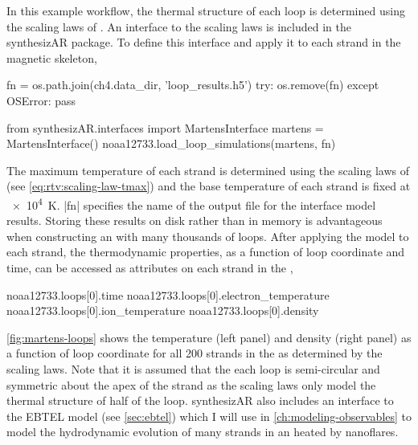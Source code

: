 In this example workflow, the thermal structure of each loop is determined using the scaling laws of \citet[see \autoref{sec:scaling_laws}]{martens_scaling_2010}. An interface to the \citeauthor{martens_scaling_2010} scaling laws is included in the synthesizAR package. To define this interface and apply it to each strand in the magnetic skeleton,
\begin{pycode}[chapter4]
fn = os.path.join(ch4.data_dir, 'loop_results.h5')
try:
    os.remove(fn)
except OSError:
    pass
\end{pycode}
\begin{pyblock}[chapter4][baselinestretch=1,xleftmargin=3em]
from synthesizAR.interfaces import MartensInterface
martens = MartensInterface()
noaa12733.load_loop_simulations(martens, fn)
\end{pyblock}
The maximum temperature of each strand is determined using the scaling laws of \citet{rosner_dynamics_1978} (see \autoref{eq:rtv:scaling-law-tmax}) and the base temperature of each strand is fixed at \SI{e4}{\kelvin}. \pyv|fn| specifies the name of the output file for the interface model results. Storing these results on disk rather than in memory is advantageous when constructing an \AR{} with many thousands of loops. After applying the model to each strand, the thermodynamic properties, as a function of loop coordinate and time, can be accessed as attributes on each strand in the \AR{},
\begin{pyblock}[chapter4][baselinestretch=1,xleftmargin=3em]
noaa12733.loops[0].time
noaa12733.loops[0].electron_temperature
noaa12733.loops[0].ion_temperature
noaa12733.loops[0].density
\end{pyblock}
\autoref{fig:martens-loops} shows the temperature (left panel) and density (right panel) as a function of loop coordinate for all 200 strands in the \AR{} as determined by the \citeauthor{martens_scaling_2010} scaling laws. Note that it is assumed that the each loop is semi-circular and symmetric about the apex of the strand as the \citeauthor{martens_scaling_2010} scaling laws only model the thermal structure of half of the loop. synthesizAR also includes an interface to the EBTEL model (see \autoref{sec:ebtel}) which I will use in \autoref{ch:modeling-observables} to model the hydrodynamic evolution of many strands in an \AR{} heated by nanoflares.

